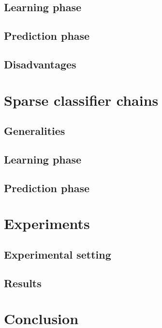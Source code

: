 \documentclass[a4paper,fleqn]{cas-sc}
\begin{document}
\subsection{Learning phase}

\subsection{Prediction phase}

\subsection{Disadvantages}

\section{Sparse classifier chains}\label{sec:Sparse classifier chains}

\subsection{Generalities}

\subsection{Learning phase}

\subsection{Prediction phase}

\section{Experiments}\label{sec:Experiments}

\subsection{Experimental setting}

\subsection{Results}

\section{Conclusion}\label{sec:Conclusion}

\end{document}
